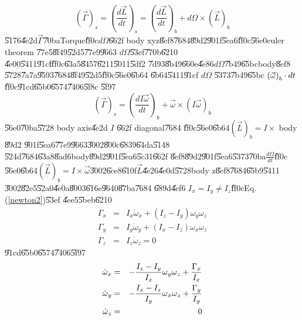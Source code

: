 \documentclass[12pt]{article}
\begin{document}
\begin{equation}
\left( \vec{\Gamma}\right) _{s}=\left( \frac{d\vec{L}}{dt}\right)
_{s}=\left( \frac{d\vec{L}}{dt}\right) _{b}+d\dot{\Omega}\times \left( \vec{L%
}\right) _{b}  \label{newton1}
\end{equation}%
\U{5176}\U{4e2d}$\vec{\Gamma}$\U{70ba}Torque\U{ff0c}$d\dot{\Omega}$\U{662f}%
body xyz\U{8ef8}\U{7684}\U{89d2}\U{901f}\U{5ea6}\U{ff0c}\U{56e0}euler theorem%
\U{77e5}\U{8f49}\U{52d5}\U{77e9}\U{9663} $d\Omega $\U{53ef}\U{770b}\U{6210}%
\U{4e00}\U{5411}\U{91cf}\U{ff0c}\U{63a5}\U{8457}\U{6211}\U{5011}\U{5df2}%
\U{7d93}\U{8b49}\U{660e}\U{4e86}$d\Omega $\U{7b49}\U{65bc}body\U{8ef8}%
\U{5728}\U{7a7a}\U{9593}\U{7684}\U{8f49}\U{52d5}\U{ff0c}\U{56e0}\U{6b64}%
\U{6b64}\U{5411}\U{91cf} $d\Omega $ \U{5373}\U{7b49}\U{65bc} $\left( \vec{%
\omega}\right) _{b}\cdot dt$\U{ff0c}\U{91cd}\U{65b0}\U{6574}\U{7406}\U{5f8c}%
\U{5f97}%
\begin{equation}
\left( \vec{\Gamma}\right) _{s}=\left( \frac{dI\vec{\omega}}{dt}\right) _{b}+%
\vec{\omega}\times \left( I\vec{\omega}\right) _{b}  \label{newton2}
\end{equation}%
\U{56e0}\U{70ba}\U{5728} body axis\U{4e2d} $I$ \U{662f} diagonal\U{7684}%
\U{ff0c}\U{56e0}\U{6b64}$\left( \vec{L}\right) _{b}=I\times $ body \U{89d2}%
\U{901f}\U{5ea6}\U{77e9}\U{9663}\U{3002}\U{800c}\U{6839}\U{64da}\U{5148}%
\U{524d}\U{7684}\U{63a8}\U{8ad6}body\U{89d2}\U{901f}\U{5ea6}\U{5c31}\U{662f}%
\U{8ef8}\U{89d2}\U{901f}\U{5ea6}\U{5373}\U{70ba}$\frac{d\Omega }{dt}$\U{ff0c}%
\U{56e0}\U{6b64}$(\vec{L})_{b}=I\times \vec{\omega}$\U{3002}\U{6ce8}\U{610f}$%
\vec{L}$\U{4e26}\U{4e0d}\U{5728}body z\U{8ef8}\U{7684}\U{65b9}\U{5411}%
\U{3002}\U{82e5}\U{52a0}\U{4e0a}\U{8003}\U{616e}\U{9640}\U{87ba}\U{7684}%
\U{689d}\U{4ef6} $I_{x}=I_{y}\neq I_{z}$\U{ff0c}Eq.(\ref{newton2})\U{53ef}%
\U{4ee5}\U{5beb}\U{6210}%
\begin{eqnarray}
\Gamma _{x} &=&I_{x}\dot{\omega}_{x}+(I_{z}-I_{y})\omega _{y}\omega _{z} \\
\Gamma _{y} &=&I_{y}\dot{\omega}_{y}+(I_{x}-I_{z})\omega _{x}\omega _{z} \\
\Gamma _{z} &=&I_{z}\dot{\omega}_{z}=0
\end{eqnarray}%
\U{91cd}\U{65b0}\U{6574}\U{7406}\U{5f97}%
\begin{eqnarray}
\dot{\omega}_{x} &=&-\frac{I_{z}-I_{y}}{I_{x}}\omega _{y}\omega _{z}+\frac{%
\Gamma _{x}}{I_{x}} \\
\dot{\omega}_{y} &=&-\frac{I_{x}-I_{z}}{I_{y}}\omega _{x}\omega _{z}+\frac{%
\Gamma _{y}}{I_{y}} \\
\dot{\omega}_{z} &=&0
\end{eqnarray}%
\end{document}
